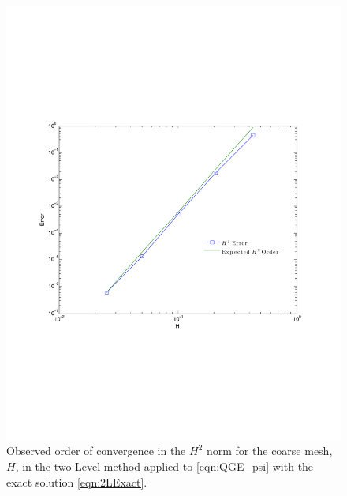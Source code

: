 \begin{figure}
  \begin{center}
    \includegraphics[scale=0.6]{Figures/CoarseConvergence.pdf}
    \caption{Observed order of convergence in the $H^2$ norm for the coarse
      mesh, $H$, in the two-Level method applied to \eqref{eqn:QGE_psi} with the
      exact solution \eqref{eqn:2LExact}.}
  \label{fig:TwoLevelH}
  \end{center}
\end{figure}

